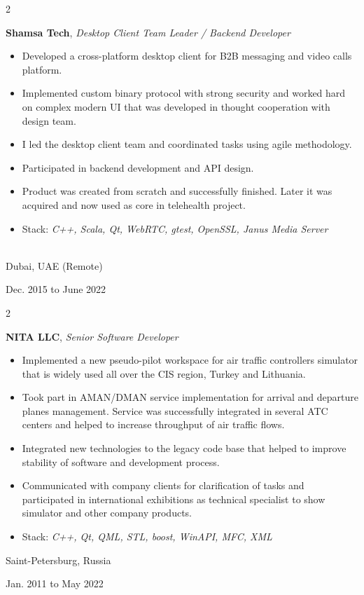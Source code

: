 \documentclass[10pt, letterpaper]{article}
\newenvironment{highlights}{
    \begin{itemize}[
        topsep=0.10 cm,
        parsep=0.10 cm,
        partopsep=0pt,
        itemsep=0pt,
        leftmargin=0.4 cm + 10pt
    ]
}{
    \end{itemize}
} %
\newenvironment{twocolentry}[2][]{
    \onecolentry
    \def\secondColumn{#2}
    \setcolumnwidth{\fill, 4.5 cm}
    \begin{paracol}{2}
}{
    \switchcolumn \raggedleft \secondColumn
    \end{paracol}
    \endonecolentry
} %
\begin{document}
        \vspace{0.2 cm}

        \begin{twocolentry}{
            Dubai, UAE (Remote)

        Dec. 2015 to June 2022
        }
            \textbf{Shamsa Tech}, \textit{Desktop Client Team Leader / Backend Developer}
            \begin{highlights}
                \item Developed a cross-platform desktop client for B2B messaging and video calls platform.
                \item Implemented custom binary protocol with strong security and worked hard on complex modern UI that was developed in thought cooperation with design team.
                \item I led the desktop client team and coordinated tasks using agile methodology.
                \item Participated in backend development and API design.
                \item Product was created from scratch and successfully finished. Later it was acquired and now used as core in telehealth project.
                \item Stack: \textit{C++, Scala, Qt, WebRTC, gtest, OpenSSL, Janus Media Server} \\ \\

            \end{highlights}
        \end{twocolentry}


        \vspace{0.2 cm}

        \begin{twocolentry}{
            Saint-Petersburg, Russia

        Jan. 2011 to May 2022
        }
            \textbf{NITA LLC}, \textit{Senior Software Developer}
            \begin{highlights}
                \item Implemented a new pseudo-pilot workspace for air traffic controllers simulator that is widely used all over the CIS region, Turkey and Lithuania.
                \item Took part in AMAN/DMAN service implementation for arrival and departure planes management. Service was successfully integrated in several ATC centers and helped to increase throughput of air traffic flows.
                \item Integrated new technologies to the legacy code base that helped to improve stability of software and development process.
                \item Communicated with company clients for clarification of tasks and participated in international exhibitions as technical specialist to show simulator and other company products.
                \item Stack: \textit{C++, Qt, QML, STL, boost, WinAPI, MFC, XML}
            \end{highlights}
        \end{twocolentry}
\end{document}
